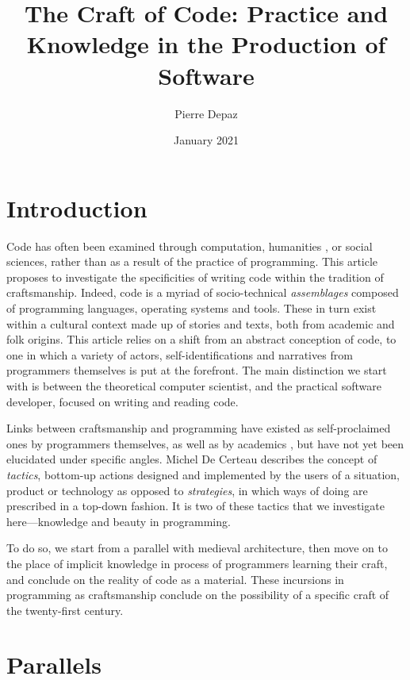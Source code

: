 \documentclass{article}
\begin{document}
\title{The Craft of Code: Practice and Knowledge in the Production of Software}
\author{Pierre Depaz}
\date{January 2021}
\maketitle

\section{Introduction}

Code has often been examined through computation\cite{berry_philosophy_2011}, humanities \cite{hayles_my_2010}, or social sciences\cite{mackenzie_cutting_2006}, rather than as a result of the practice of programming. This article proposes to investigate the specificities of writing code within the tradition of craftsmanship. Indeed, code is a myriad of socio-technical \textit{assemblages} composed of programming languages, operating systems and tools. These in turn exist within a cultural context made up of stories and texts, both from academic and folk origins. This article relies on a shift from an abstract conception of code, to one in which a variety of actors\cite{hayes_cultures_2017}, self-identifications and narratives from programmers themselves is put at the forefront. The main distinction we start with is between the theoretical computer scientist, and the practical software developer, focused on writing and reading code.

Links between craftsmanship and programming have existed as self-proclaimed ones by programmers themselves, as well as by academics \cite{sennett_craftsman_2009}, but have not yet been elucidated under specific angles. Michel De Certeau describes the concept of \textit{tactics}, bottom-up actions designed and implemented by the users of a situation, product or technology as opposed to \textit{strategies}\cite{certeau_invention_1990}, in which ways of doing are prescribed in a top-down fashion. It is two of these tactics that we investigate here---knowledge and beauty in programming.

To do so, we start from a parallel with medieval architecture, then move on to the place of implicit knowledge in process of programmers learning their craft, and conclude on the reality of code as a material. These incursions in programming as craftsmanship conclude on the possibility of a specific craft of the twenty-first century.

\section{Parallels}
\end{document}
